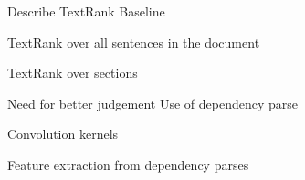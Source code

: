 Describe TextRank {Baseline}

TextRank over all sentences in the document

TextRank over sections

Need for better judgement {Use of dependency parse}

Convolution kernels

Feature extraction from dependency parses

